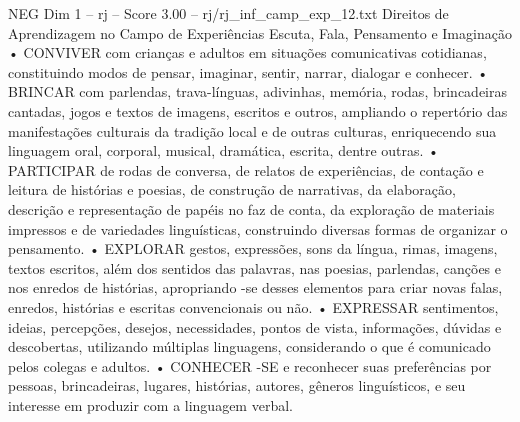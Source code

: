 \begin{textsample}{NEG Dim 1 – rj – Score 3.00 – rj/rj\_inf\_camp\_exp\_12.txt}  \label{ex:f1_neg_005}
Direitos de Aprendizagem no Campo de Experiências Escuta, Fala, Pensamento e Imaginação • CONVIVER com crianças e adultos em situações comunicativas cotidianas, constituindo modos de pensar, imaginar, sentir, narrar, dialogar e conhecer. • BRINCAR com parlendas, trava-línguas, adivinhas, memória, rodas, brincadeiras cantadas, jogos e textos de imagens, escritos e outros, ampliando o repertório das manifestações culturais da tradição local e de outras culturas, enriquecendo sua linguagem oral, corporal, musical, dramática, escrita, dentre outras. • PARTICIPAR de rodas de conversa, de relatos de experiências, de contação e leitura de histórias e poesias, de construção de narrativas, da elaboração, descrição e representação de papéis no faz de conta, da exploração de materiais impressos e de variedades linguísticas, construindo diversas formas de organizar o pensamento. • EXPLORAR gestos, expressões, sons da língua, rimas, imagens, textos escritos, além dos sentidos das palavras, nas poesias, parlendas, canções e nos enredos de histórias, apropriando -se desses elementos para criar novas falas, enredos, histórias e escritas convencionais ou não. • EXPRESSAR sentimentos, ideias, percepções, desejos, necessidades, pontos de vista, informações, dúvidas e descobertas, utilizando múltiplas linguagens, considerando o que é comunicado pelos colegas e adultos. • CONHECER -SE e reconhecer suas preferências por pessoas, brincadeiras, lugares, histórias, autores, gêneros linguísticos, e seu interesse em produzir com a linguagem verbal.

\end{textsample}
